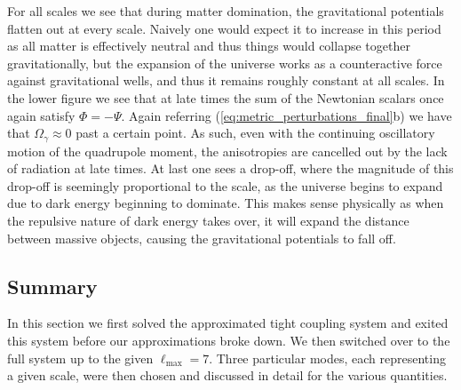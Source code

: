 \documentclass[%
reprint,
 amsmath,amssymb,
 aps,
]{revtex4-2}
\begin{document}
For all scales we see that during matter domination, the gravitational potentials flatten out at every scale. Naively one would expect it to increase in this period as all matter is effectively neutral and thus things would collapse together gravitationally, but the expansion of the universe works as a counteractive force against gravitational wells, and thus it remains roughly constant at all scales. In the lower figure we see that at late times the sum of the Newtonian scalars once again satisfy $\Phi=-\Psi$. Again referring (\ref{eq:metric_perturbations_final}b) we have that $\Omega_\gamma\approx0$ past a certain point. As such, even with the continuing oscillatory motion of the quadrupole moment, the anisotropies are cancelled out by the lack of radiation at late times.  At last one sees a drop-off, where the magnitude of this drop-off is seemingly proportional to the scale, as the universe begins to expand due to dark energy beginning to dominate. This makes sense physically as when the repulsive nature of dark energy takes over, it will expand the distance between massive objects, causing the gravitational potentials to fall off.

\subsection{Summary}
In this section we first solved the approximated tight coupling system and exited this system before our approximations broke down. We then switched over to the full system up to the given $\ell_\text{max}=7$. Three particular modes, each representing a given scale, were then chosen and discussed in detail for the various quantities. 
\end{document}
